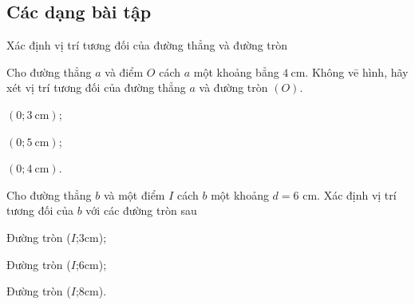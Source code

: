 \subsection{Các dạng bài tập}
\begin{dang}{Xác định vị trí tương đối của đường thẳng và đường tròn}
\end{dang}
\begin{vd}
	Cho đường thẳng $a$ và điểm $O$ cách $a$ một khoảng bẳng $4 \mathrm{~cm}$. Không vē hình, hãy xét vị trí tương đối của đường thẳng $a$ và đường tròn $(O)$.
	\begin{listEX}[3]
	\item $(0; 3 \mathrm{~cm})$;
	\item $(0; 5 \mathrm{~cm})$;
	\item $(0; 4 \mathrm{~cm})$.
	\end{listEX}
\end{vd}
\begin{vd}
	Cho đường thẳng $b$ và một điểm $I$ cách $b$ một khoảng $d=6$ cm. Xác định vị trí tương đối của $b$ với các đường tròn sau
	\begin{listEX}[3]
	\item Đường tròn ($I$;$3$cm);
	\item Đường tròn ($I$;$6$cm);
	\item Đường tròn ($I$;$8$cm).
	\end{listEX}
\end{vd}
